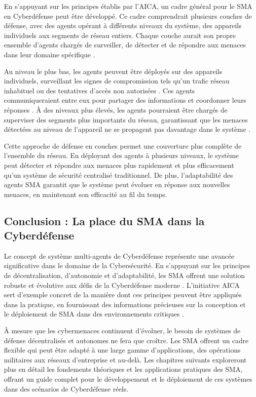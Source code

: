 En s'appuyant sur les principes établis par l'AICA, un cadre général pour le SMA en Cyberdéfense peut être développé. Ce cadre comprendrait plusieurs couches de défense, avec des agents opérant à différents niveaux du système, des appareils individuels aux segments de réseau entiers. Chaque couche aurait son propre ensemble d'agents chargés de surveiller, de détecter et de répondre aux menaces dans leur domaine spécifique \cite{bou-harb2017cyber}.

Au niveau le plus bas, les agents peuvent être déployés sur des appareils individuels, surveillant les signes de compromission tels qu'un trafic réseau inhabituel ou des tentatives d'accès non autorisées \cite{kolias2011swarm}. Ces agents communiqueraient entre eux pour partager des informations et coordonner leurs réponses \cite{shamshirband2018computational}. À des niveaux plus élevés, les agents pourraient être chargés de superviser des segments plus importants du réseau, garantissant que les menaces détectées au niveau de l'appareil ne se propagent pas davantage dans le système \cite{hu2018mimic}.

Cette approche de défense en couches permet une couverture plus complète de l'ensemble du réseau. En déployant des agents à plusieurs niveaux, le système peut détecter et répondre aux menaces plus rapidement et plus efficacement qu'un système de sécurité centralisé traditionnel. De plus, l'adaptabilité des agents SMA garantit que le système peut évoluer en réponse aux nouvelles menaces, en maintenant son efficacité au fil du temps.

\subsection{Conclusion : La place du SMA dans la Cyberdéfense}

Le concept de système multi-agents de Cyberdéfense représente une avancée significative dans le domaine de la Cybersécurité. En s'appuyant sur les principes de décentralisation, d'autonomie et d'adaptabilité, les SMA offrent une solution robuste et évolutive aux défis de la Cyberdéfense moderne \cite{kolias2011swarm}. L'initiative AICA sert d'exemple concret de la manière dont ces principes peuvent être appliqués dans la pratique, en fournissant des informations précieuses sur la conception et le déploiement de SMA dans des environnements critiques \cite{bou-harb2014cyber}.

À mesure que les cybermenaces continuent d'évoluer, le besoin de systèmes de défense décentralisés et autonomes ne fera que croître. Les SMA offrent un cadre flexible qui peut être adapté à une large gamme d'applications, des opérations militaires aux réseaux d'entreprise et au-delà. Les chapitres suivants exploreront plus en détail les fondements théoriques et les applications pratiques des SMA, offrant un guide complet pour le développement et le déploiement de ces systèmes dans des scénarios de Cyberdéfense réels.


